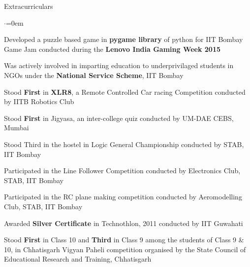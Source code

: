 \documentclass[a4paper,8pt]{resume}%
\begin{document}
\begin{rSection}{Extracurriculars}
\begin{list}{$\cdot$}{\leftmargin=0em}
{
\item Developed a puzzle based game in \textbf{pygame library} of python for IIT Bombay Game Jam conducted during the \textbf{Lenovo India Gaming Week 2015} 
\item Was actively involved in imparting education to underprivilaged students in NGOs under the \textbf{National Service Scheme}, IIT Bombay
\item Stood \textbf{First} in \textbf{XLR8}, a Remote Controlled Car racing Competition conducted by IITB Robotics Club
\item Stood \textbf{First} in Jigyasa, an inter-college quiz conducted by UM-DAE CEBS, Mumbai
\item Stood Third in the hostel in Logic General Championship conducted by STAB, IIT Bombay
\item Participated in the Line Follower Competition conducted by Electronics Club, STAB, IIT Bombay
\item Participated in the RC plane making competition conducted by Aeromodelling Club, STAB, IIT Bombay
\item Awarded \textbf{Silver Certificate} in Technothlon, 2011 conducted by IIT Guwahati
\item Stood \textbf{First} in Class 10 and \textbf{Third} in Class 9 among the students of Class 9 \& 10, in Chhatisgarh Vigyan Paheli competition organised by the State Council of Educational Research and Training, Chhatisgarh  
}%


\end{list}
\end{rSection}
\end{document}
